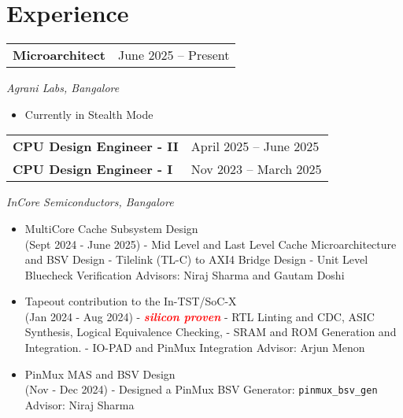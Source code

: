 \section{\sc Experience}


\begin{tabular}{@{}p{4in}p{2in}}
  {\bf{Microarchitect}}  & June 2025 – Present \\
\end{tabular}  
\textit{Agrani Labs, Bangalore} 
  \begin{itemize}
    \setlength\itemsep{0em}
    \item Currently in Stealth Mode
  \end{itemize}
\begin{tabular}{@{}p{4in}p{2in}}
    {\bf{CPU Design Engineer - II}}  & April 2025 – June 2025 \\
    {\bf{CPU Design Engineer - I}}  & Nov 2023 – March 2025 \\
  \end{tabular}  
  \textit{InCore Semiconductors, Bangalore} 
  \begin{itemize}
    \setlength\itemsep{0em}
    \item MultiCore Cache Subsystem Design \\
    (Sept 2024 - June 2025)
      \subitem - Mid Level and Last Level Cache Microarchitecture and BSV Design 
      \subitem - Tilelink (TL-C) to AXI4 Bridge Design
      \subitem - Unit Level Bluecheck Verification 
      \subitem Advisors: Niraj Sharma and Gautam Doshi     
    \item Tapeout contribution to the In-TST/SoC-X  \\ (Jan 2024 - Aug 2024)
      \subitem - {\bf \textcolor{red} {\textit{{silicon proven}}}} 
      \subitem - RTL Linting and CDC, ASIC Synthesis, Logical Equivalence Checking, 
      \subitem - SRAM and ROM Generation and Integration.
      \subitem - IO-PAD and PinMux Integration
      \subitem Advisor: Arjun Menon
    \item PinMux MAS and BSV Design 
    \\ (Nov - Dec 2024)
      \subitem - Designed a PinMux BSV Generator: {\tt pinmux\_bsv\_gen}
      \subitem Advisor: Niraj Sharma       
\end{itemize}

